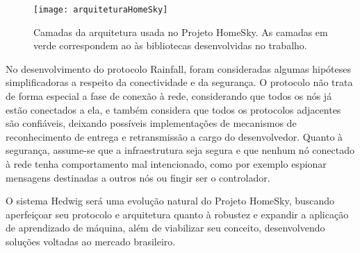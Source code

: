 \begin{figure}[H]
	\centering
	\caption{Camadas da arquitetura usada no Projeto HomeSky. As camadas em verde correspondem ao às bibliotecas desenvolvidas no trabalho.}
  \texttt{[image: arquiteturaHomeSky]}
\label{fig:arquiteturaHomeSky}
\end{figure}

No desenvolvimento do protocolo Rainfall, foram consideradas algumas hipóteses simplificadoras a respeito da conectividade e da segurança. O protocolo não trata de forma especial a fase de conexão à rede, considerando que todos os nós já estão conectados a ela, e também considera que todos os protocolos adjacentes são confiáveis, deixando possíveis implementações de mecanismos de reconhecimento de entrega e retransmissão a cargo do desenvolvedor. Quanto à segurança, assume-se que a infraestrutura seja segura e que nenhum nó conectado à rede tenha comportamento mal intencionado, como por exemplo espionar mensagens destinadas a outros nós ou fingir ser o controlador.

O sistema Hedwig será uma evolução natural do Projeto HomeSky, buscando aperfeiçoar seu protocolo e arquitetura quanto à robustez e expandir a aplicação de aprendizado de máquina, além de viabilizar seu conceito, desenvolvendo soluções voltadas ao mercado brasileiro.
